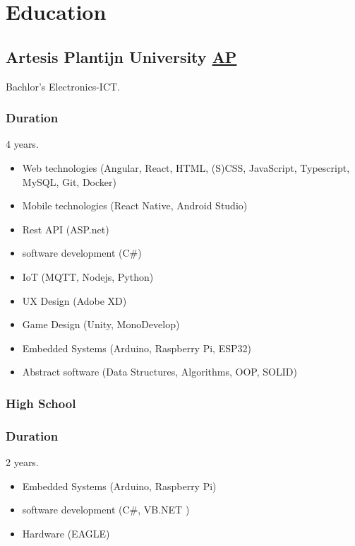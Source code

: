 \pagebreak
\section{Educat\textcolor{mycolor}{ion}}
  \subsection{Artesis Plantijn University \href{https://ap.be}{AP}}
    \hspace*{\fill}{\textcolor{mygrey}{2018-2022}}

    Bachlor's Electronics-ICT.
    \subsubsection{Duration}
      4 years.
      \begin{itemize}
        \item Web technologies (Angular, React, HTML, (S)CSS, JavaScript, Typescript, MySQL, Git, Docker)
        \item Mobile technologies (React Native, Android Studio)
        \item Rest API (ASP.net)
        \item software development (C\#)
        \item IoT (MQTT, Nodejs, Python)
        \item UX Design (Adobe XD)
        \item Game Design (Unity, MonoDevelop)
        \item Embedded Systems (Arduino, Raspberry Pi, ESP32)
        \item Abstract software (Data Structures, Algorithms, OOP, SOLID)
      \end{itemize}
  \subsubsection{High School}
    \subsubsection{Duration}
      2 years.
      \begin{itemize}
        \item Embedded Systems (Arduino, Raspberry Pi)
        \item software development (C\#, VB.NET )
        \item Hardware (EAGLE)
      \end{itemize}
